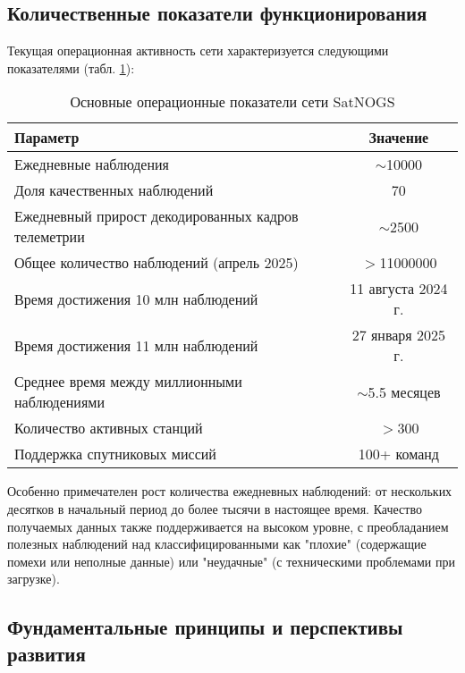 \subsection{Количественные показатели функционирования}

Текущая операционная активность сети характеризуется следующими показателями
(табл. \ref{tab:satnogs_stats}):

\begin{table}[H]
	\centering
	\begin{tabular}{|l|c|}
		\hline
		\textbf{Параметр}                                   & \textbf{Значение}  \\
		\hline
		Ежедневные наблюдения                               & $\sim$10000        \\
		\hline
		Доля качественных наблюдений                        & 70                 \\
		\hline
		Ежедневный прирост декодированных кадров телеметрии & $\sim$2500         \\
		\hline
		Общее количество наблюдений (апрель 2025)           & $>$11000000        \\
		\hline
		Время достижения 10 млн наблюдений                  & 11 августа 2024 г. \\
		\hline
		Время достижения 11 млн наблюдений                  & 27 января 2025 г.  \\
		\hline
		Среднее время между миллионными наблюдениями        & $\sim$5.5 месяцев  \\
		\hline
		Количество активных станций                         & $>$300             \\
		\hline
		Поддержка спутниковых миссий                        & 100+ команд        \\
		\hline
	\end{tabular}
	\caption{Основные операционные показатели сети SatNOGS}
	\label{tab:satnogs_stats}
\end{table}

Особенно примечателен рост количества ежедневных наблюдений: от нескольких
десятков в начальный период до более тысячи в настоящее время. Качество
получаемых данных также поддерживается на высоком уровне, с преобладанием
полезных наблюдений над классифицированными как "плохие" (содержащие помехи или
неполные данные) или "неудачные" (с техническими проблемами при загрузке).

\subsection{Фундаментальные принципы и перспективы развития}

